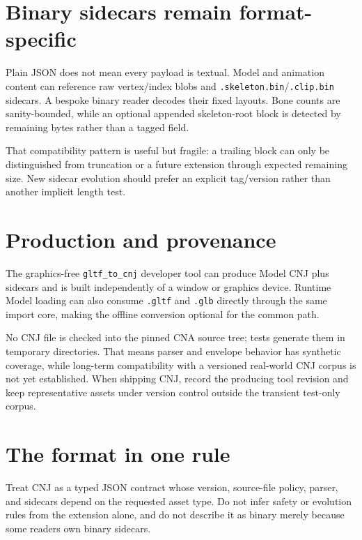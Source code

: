 \section{Binary sidecars remain format-specific}

Plain JSON does not mean every payload is textual.  Model and animation content can reference
raw vertex/index blobs and \texttt{.skeleton.bin}/\texttt{.clip.bin} sidecars.  A bespoke binary
reader decodes their fixed layouts.  Bone counts are sanity-bounded, while an optional appended
skeleton-root block is detected by remaining bytes rather than a tagged field.

That compatibility pattern is useful but fragile: a trailing block can only be distinguished
from truncation or a future extension through expected remaining size.  New sidecar evolution
should prefer an explicit tag/version rather than another implicit length test.

\section{Production and provenance}

The graphics-free \texttt{gltf\_to\_cnj} developer tool can produce Model CNJ plus sidecars and
is built independently of a window or graphics device.  Runtime Model loading can also consume
\texttt{.gltf} and \texttt{.glb} directly through the same import core, making the offline
conversion optional for the common path.

No CNJ file is checked into the pinned CNA source tree; tests generate them in temporary
directories.  That means parser and envelope behavior has synthetic coverage, while long-term
compatibility with a versioned real-world CNJ corpus is not yet established.  When shipping CNJ,
record the producing tool revision and keep representative assets under version control outside
the transient test-only corpus.

\section{The format in one rule}

Treat CNJ as a typed JSON contract whose version, source-file policy, parser, and sidecars depend
on the requested asset type.  Do not infer safety or evolution rules from the extension alone,
and do not describe it as binary merely because some readers own binary sidecars.
